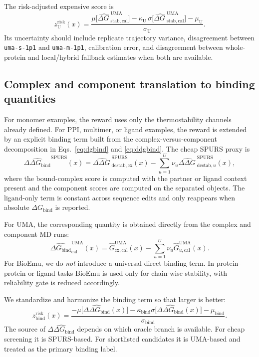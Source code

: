 \documentclass[11pt]{article}
\newcommand{\ddG}{\ensuremath{\Delta\Delta G \ }}
\newcommand{\dG}{\ensuremath{\Delta G \ }}
\newcommand{\ddGbind}{\ensuremath{\Delta\Delta G_{\mathrm{bind}}}}
\newcommand{\dGbind}{\ensuremath{\Delta G_{\mathrm{bind}}}}
\begin{document}
	The risk-adjusted expensive score is
	\begin{equation}
		z_{\mathrm U}^{\mathrm{risk}}(x)=\frac{\mu\big[\widehat{\dG}^{\mathrm{UMA}}_{\mathrm{stab,cal}}\big]-\kappa_{\mathrm U}\,\sigma\big[\widehat{\dG}^{\mathrm{UMA}}_{\mathrm{stab,cal}}\big]-\mu_{\mathrm U}}{\sigma_{\mathrm U}}.
	\end{equation}
	Its uncertainty should include replicate trajectory variance, disagreement between \texttt{uma-s-1p1} and \texttt{uma-m-1p1}, calibration error, and disagreement between whole-protein and local/hybrid fallback estimates when both are available.
	
	\subsection{Complex and component translation to binding quantities}
	
	For monomer examples, the reward uses only the thermostability channels already defined. For PPI, multimer, or ligand examples, the reward is extended by an explicit binding term built from the complex-versus-component decomposition in Eqs.~\eqref{eq:dgbind} and \eqref{eq:ddgbind}. The cheap SPURS proxy is
	\begin{equation}
		\label{eq:spursbind}
		\widehat{\ddGbind}^{\mathrm{SPURS}}(x)=\widehat{\ddG}^{\mathrm{SPURS}}_{\mathrm{destab,cx}}(x)-\sum_{u=1}^{U}\nu_u\widehat{\ddG}^{\mathrm{SPURS}}_{\mathrm{destab},u}(x),
	\end{equation}
	where the bound-complex score is computed with the partner or ligand context present and the component scores are computed on the separated objects. The ligand-only term is constant across sequence edits and only reappears when absolute $\dGbind$ is reported.
	
	For UMA, the corresponding quantity is obtained directly from the complex and component MD runs:
	\begin{equation}
		\widehat{\dGbind}^{\mathrm{UMA}}_{\mathrm{cal}}(x)=\widehat G^{\mathrm{UMA}}_{\mathrm{cx,cal}}(x)-\sum_{u=1}^{U}\nu_u\widehat G^{\mathrm{UMA}}_{u,\mathrm{cal}}(x).
	\end{equation}
	For BioEmu, we do \emph{not} introduce a universal direct binding term. In protein-protein or ligand tasks BioEmu is used only for chain-wise stability, with reliability gate is reduced accordingly.
	
	We standardize and harmonize the binding term so that larger is better:
	\begin{equation}
		z_{\mathrm{bind}}^{\mathrm{risk}}(x)=\frac{-\mu\big[\widehat{\ddGbind}(x)\big]-\kappa_{\mathrm{bind}}\sigma\big[\widehat{\ddGbind}(x)\big]-\mu_{\mathrm{bind}}}{\sigma_{\mathrm{bind}}}.
	\end{equation}
	The source of $\widehat{\ddGbind}$ depends on which oracle branch is available. For cheap screening it is SPURS-based. For shortlisted candidates it is UMA-based and treated as the primary binding label.
	
\end{document}
